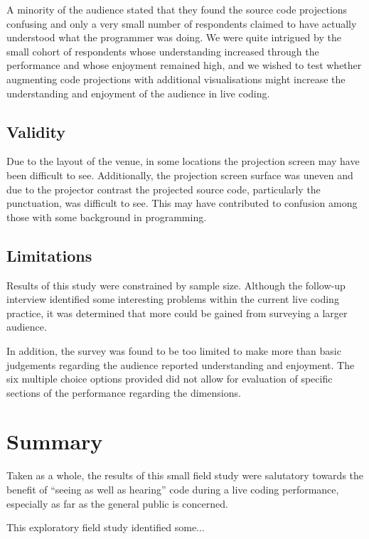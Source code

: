 A minority of the audience stated that they found the source code projections confusing and only a very small number of respondents claimed to have actually understood what the programmer was doing. We were quite intrigued by the small cohort of respondents whose understanding increased through the performance and whose enjoyment remained high, and we wished to test whether augmenting code projections with additional visualisations might increase the understanding and enjoyment of the audience in live coding. \fix

\subsection{Validity}

Due to the layout of the venue, in some locations the projection screen may have been difficult to see. Additionally, the projection screen surface was uneven and due to the projector contrast the projected source code, particularly the punctuation, was difficult to see. This may have contributed to confusion among those with some background in programming.

\more

\subsection{Limitations}

Results of this study were constrained by sample size. Although the follow-up interview identified some interesting problems within the current live coding practice, it was determined that more could be gained from surveying a larger audience.

In addition, the survey was found to be too limited to make more than basic judgements regarding the audience reported understanding and enjoyment. The six multiple choice options provided did not allow for evaluation of specific sections of the performance regarding the dimensions.

\section{Summary}

Taken as a whole, the results of this small field study were salutatory towards the benefit of ``seeing as well as hearing'' code during a live coding performance, especially as far as the general public is concerned. \fix

This exploratory field study identified some...\more


